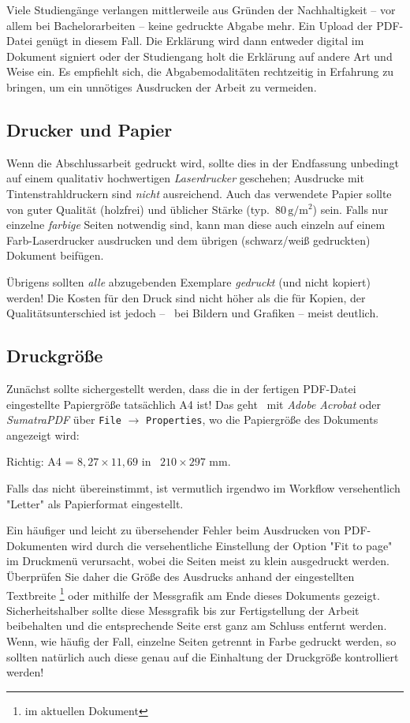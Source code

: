 Viele Studiengänge verlangen mittlerweile aus Gründen der Nachhaltigkeit -- vor
allem bei Bachelorarbeiten -- keine gedruckte Abgabe mehr. Ein Upload der
PDF-Datei genügt in diesem Fall. Die Erklärung wird dann entweder digital im
Dokument signiert oder der Studiengang holt die Erklärung auf andere Art und
Weise ein. Es empfiehlt sich, die Abgabemodalitäten rechtzeitig in Erfahrung zu bringen, um ein unnötiges Ausdrucken der Arbeit zu vermeiden.

\subsection{Drucker und Papier}

Wenn die Abschlussarbeit gedruckt wird, sollte dies in der Endfassung unbedingt
auf einem qualitativ hochwertigen \emph{Laserdrucker} geschehen; Ausdrucke mit
Tintenstrahldruckern sind \emph{nicht} ausreichend. Auch das verwendete
Papier sollte von guter Qualität (holzfrei) und üblicher Stärke (typ.\  
$80\,\mathrm{g} / \mathrm{m}^2$) sein. Falls nur einzelne \emph{farbige} Seiten 
notwendig sind, kann man diese auch einzeln auf einem Farb-Laserdrucker ausdrucken
und dem übrigen (schwarz/weiß gedruckten) Dokument beifügen.

Übrigens sollten \emph{alle} abzugebenden Exemplare \emph{gedruckt} (und
nicht kopiert) werden! Die Kosten für den Druck sind nicht höher als die für
Kopien, der Qualitätsunterschied ist jedoch -- \va\ bei Bildern und Grafiken
-- meist deutlich.

\subsection{Druckgröße}

Zunächst sollte sichergestellt werden, dass die in der fertigen PDF-Datei
eingestellte Papiergröße tatsächlich \textrm{A4} ist! Das geht \zB\ mit
\emph{Adobe Acrobat} oder \emph{SumatraPDF} über \texttt{File} $\rightarrow$
\texttt{Properties}, wo die Papiergröße des Dokuments angezeigt wird:
\begin{center}
	\textrm{Richtig:} A4 = $8{,}27 \times 11{,}69$ in \bzw\ $210 \times 297$ mm.
\end{center}
Falls das nicht übereinstimmt, ist vermutlich irgendwo im Workflow versehentlich
"Letter" als Papierformat eingestellt.


Ein häufiger und leicht zu übersehender Fehler beim Ausdrucken von
PDF-Doku\-menten wird durch die versehentliche Einstellung der Option "Fit to
page" im Druckmenü verursacht, wobei die Seiten meist zu klein ausgedruckt
werden. Überprüfen Sie daher die Größe des Ausdrucks anhand der eingestellten
Textbreite%
\footnote{\Convert[unit=mm]{\the\textwidth}	im aktuellen Dokument} %
oder mithilfe der Messgrafik am Ende dieses Dokuments gezeigt.
Sicherheitshalber sollte diese Messgrafik bis zur Fertigstellung der
Arbeit beibehalten und die entsprechende Seite erst ganz am Schluss
entfernt werden. Wenn, wie häufig der Fall, einzelne Seiten getrennt in Farbe
gedruckt werden, so sollten natürlich auch diese genau auf die Einhaltung der
Druckgröße kontrolliert werden!


